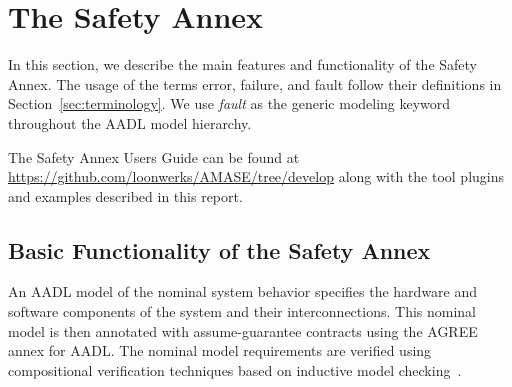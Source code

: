 \section{The Safety Annex}
\label{sec:safety_annex}

In this section, we describe the main features and functionality of the Safety Annex. The usage of the terms error, failure, and fault follow their definitions in Section~\ref{sec:terminology}. We use {\em fault} as the generic modeling keyword throughout the AADL model hierarchy.

The Safety Annex Users Guide can be found at \url{https://github.com/loonwerks/AMASE/tree/develop} along with the tool plugins and examples described in this report. 




\subsection{Basic Functionality of the Safety Annex}

An AADL model of the nominal system behavior specifies the hardware and software components of the system and their interconnections. This nominal model is then annotated with assume-guarantee contracts using the AGREE annex for AADL. The nominal model requirements are verified using compositional verification techniques based on inductive model checking~\cite{2017arXiv171201222G}.

